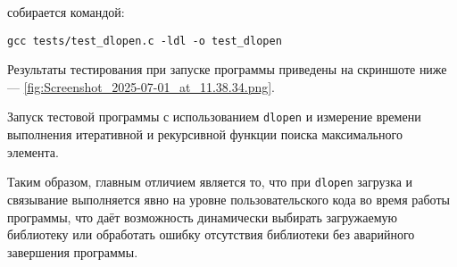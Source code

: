 \vspace{.3cm}

 собирается командой:
\begin{verbatim}
gcc tests/test_dlopen.c -ldl -o test_dlopen
\end{verbatim}

Результаты тестирования при запуске программы приведены на скриншоте ниже --- \ref{fig:Screenshot_2025-07-01_at_11.38.34.png}.

{Запуск тестовой программы с использованием \texttt{dlopen} и измерение времени выполнения итеративной и рекурсивной функции поиска максимального элемента.}

Таким образом, главным отличием является то, что при \texttt{dlopen} загрузка и связывание выполняется явно на уровне пользовательского кода во время работы программы, что даёт возможность динамически выбирать загружаемую библиотеку или обработать ошибку отсутствия библиотеки без аварийного завершения программы.